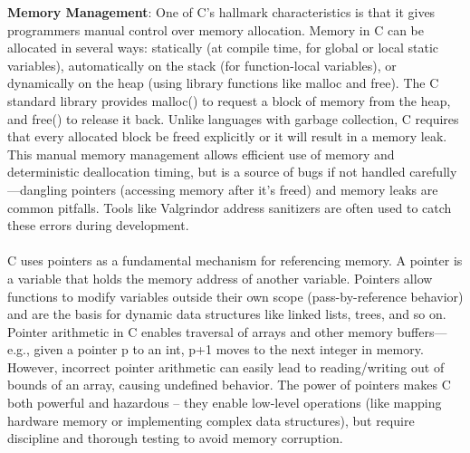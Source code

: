 \documentclass{article}
\begin{document}
{\normalsize \textbf{Memory Management}}: {\normalsize One of C's hallmark characteristics is that it gives programmers manual control over memory allocation. Memory in C can be allocated i}{\normalsize n several ways: statically (at compile time, for global or local static variables), automatically on the stack (for function-local variables), or dynamically on the heap (using library functions like malloc and free). The C standard library provides }{\normalsize malloc}{\normalsize (}{\normalsize ) to request a block of memory from the heap, and free() to release it back. Unlike languages with garbage collection, C requires that every allocated block be freed explicitly or it will result in a memory leak. This manual memory management allows effic}{\normalsize ient use of memory and deterministic deallocation timing, but is a }{\normalsize source of bugs if not handled carefully—dangling pointers (accessing memory after it's freed) and memory leaks are common pitfalls. Tools like }{\normalsize Valgrind}{\normalsize  or address sanitizers are often used }{\normalsize to catch these errors during development.}\\
\\
{\normalsize C uses pointers as a fundamental mechanism for referencing memory. A pointer is a variable that holds the memory address of another variable. Pointers allow functions to modify variables outside their own scope (p}{\normalsize ass-by-reference behavior) and are the basis for dynamic data structures like linked lists, trees, and so on. Pointer arithmetic in C enables traversal of arrays and other memory buffers—e.g., given a pointer p to an int, p+1 moves to the next integer in m}{\normalsize emory. However, incorrect pointer arithmetic can easily lead to reading/writing out of bounds of an array, causing undefined behavior. The power of pointers makes C both powerful and hazardous – they enable low-level operations (like mapping hardware memor}{\normalsize y or implementing complex data structures), but require discipline and thorough testing to avoid memory corruption}.\\
\\
\end{document}

